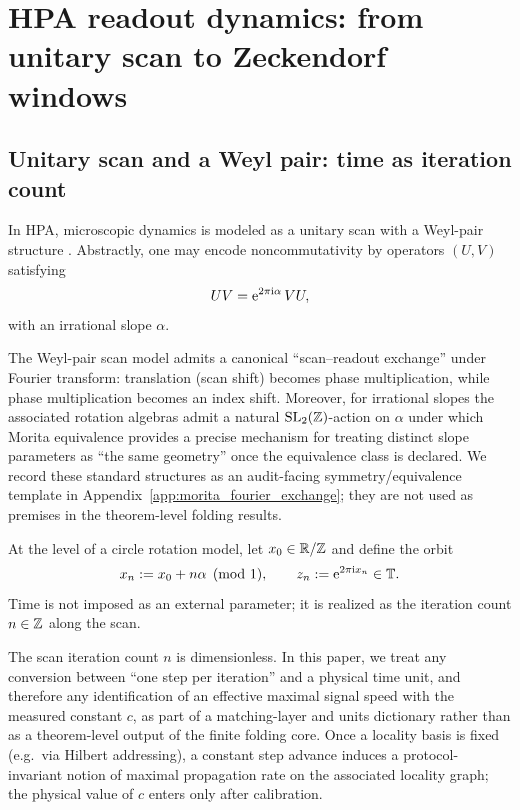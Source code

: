 
\section{HPA readout dynamics: from unitary scan to Zeckendorf windows}
\label{sec:hpa_readout}

\subsection{Unitary scan and a Weyl pair: time as iteration count}
\label{subsec:weyl_scan}

In HPA, microscopic dynamics is modeled as a unitary scan with a Weyl-pair structure \cite{Weyl1931}.
Abstractly, one may encode noncommutativity by operators $(U,V)$ satisfying
\begin{equation}\label{eq:weyl_pair}
UV=\mathrm{e}^{2\pi\mathrm{i}\alpha}\,VU,
\end{equation}
with an irrational slope $\alpha$.
\begin{remark}\label{rem:weyl_morita_fourier_exchange}
\AuditTag The Weyl-pair scan model admits a canonical ``scan--readout exchange'' under Fourier transform: translation (scan shift) becomes phase multiplication, while phase multiplication becomes an index shift.
Moreover, for irrational slopes the associated rotation algebras admit a natural $\mathrm{SL}_2(\mathbb{Z})$-action on $\alpha$ under which Morita equivalence provides a precise mechanism for treating distinct slope parameters as ``the same geometry'' once the equivalence class is declared.
We record these standard structures as an audit-facing symmetry/equivalence template in Appendix~\ref{app:morita_fourier_exchange}; they are not used as premises in the theorem-level folding results.
\end{remark}
At the level of a circle rotation model, let $x_0\in\mathbb{R}/\mathbb{Z}$ and define the orbit
\begin{equation}\label{eq:kronecker_orbit}
x_n:=x_0+n\alpha \pmod{1},\qquad
z_n:=\mathrm{e}^{2\pi\mathrm{i} x_n}\in\mathbb{T}.
\end{equation}
Time is not imposed as an external parameter; it is realized as the iteration count $n\in\mathbb{Z}$ along the scan.

\begin{remark}\label{rem:scan_rate_c_dictionary}
The scan iteration count $n$ is dimensionless.
In this paper, we treat any conversion between ``one step per iteration'' and a physical time unit, and therefore any identification of an effective maximal signal speed with the measured constant $c$, as part of a matching-layer and units dictionary rather than as a theorem-level output of the finite folding core.
Once a locality basis is fixed (e.g.\ via Hilbert addressing), a constant step advance induces a protocol-invariant notion of maximal propagation rate on the associated locality graph; the physical value of $c$ enters only after calibration.
\end{remark}

